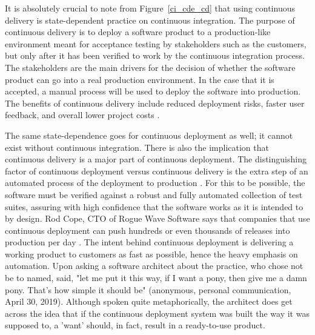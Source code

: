 \documentclass[12pt,a4paper]{article}
\begin{document}
It is absolutely crucial to note from Figure~\ref{ci_cde_cd} that using continuous delivery is state-dependent practice on continuous integration. The purpose of continuous delivery is to deploy a software product to a production-like environment meant for acceptance testing by stakeholders such as the customers, but only after it has been verified to work by the continuous integration process. The stakeholders are the main drivers for the decision of whether the software product can go into a real production environment. In the case that it is accepted, a manual process will be used to deploy the software into production. The benefits of continuous delivery include reduced deployment risks, faster user feedback, and overall lower project costs \cite[p. ~3910-3911]{shahin_babar_zhu_2017}.

The same state-dependence goes for continuous deployment as well; it cannot exist without continuous integration. There is also the implication that continuous delivery is a major part of continuous deployment. The distinguishing factor of continuous deployment versus continuous delivery is the extra step of an automated process of the deployment to production \cite[p. ~3911]{shahin_babar_zhu_2017}. For this to be possible, the software must be verified against a robust and fully automated collection of test suites, assuring with high confidence that the software works as it is intended to by design. Rod Cope, CTO of Rogue Wave Software says that companies that use continuous deployment can push hundreds or even thousands of releases into production per day \cite{stackify_2018}. The intent behind continuous deployment is delivering a working product to customers as fast as possible, hence the heavy emphasis on automation. Upon asking a software architect about the practice, who chose not be to named, said, "let me put it this way, if I want a pony, then give me a damn pony. That's how simple it should be" (anonymous, personal communication, April 30, 2019). Although spoken quite metaphorically, the architect does get across the idea that if the continuous deployment system was built the way it was supposed to, a 'want' should, in fact, result in a ready-to-use product.
\end{document}
